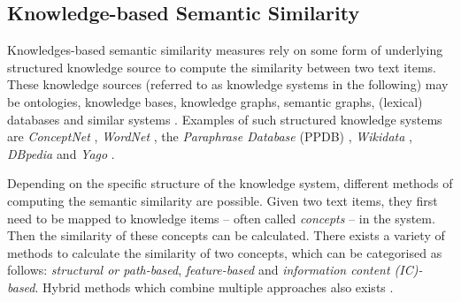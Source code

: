 \documentclass[11pt, numbers=noenddot]{scrreprt}
\let\cite\parencite  %
\begin{document}
\subsection{Knowledge-based Semantic Similarity}
\label{sec:knowledge-based-semantic-similarity}
Knowledges-based semantic similarity measures rely on some form of underlying structured knowledge source to compute the similarity between two text items. These knowledge sources (referred to as knowledge systems in the following) may be ontologies, knowledge bases, knowledge graphs, semantic graphs, (lexical) databases and similar systems \cite{chandrasekaranEvolutionSemanticSimilarity2021, harispeSemanticSimilarityNatural2015}. Examples of such structured knowledge systems are \textit{ConceptNet} \cite{speerConceptNetOpenMultilingual2017}, \textit{WordNet} \cite{millerWordNetLexicalDatabase1995}, the \textit{Paraphrase Database} (PPDB) \cite{ganitkevitchPPDBParaphraseDatabase2013}, \textit{Wikidata} \cite{vrandecicWikidataFreeCollaborative2014}, \textit{DBpedia} \cite{auerDBpediaNucleusWeb2007} and \textit{Yago} \cite{suchanekYagoCoreSemantic2007}.


Depending on the specific structure of the knowledge system, different methods of computing the semantic similarity are possible. Given two text items, they first need to be mapped to knowledge items -- often called \textit{concepts} -- in the system. Then the similarity of these concepts can be calculated. There exists a variety of methods to calculate the similarity of two concepts, which can be categorised as follows: \textit{structural or path-based}, \textit{feature-based} and \textit{information content (IC)-based}. Hybrid methods which combine multiple approaches also exists \cite{chandrasekaranEvolutionSemanticSimilarity2021, harispeSemanticSimilarityNatural2015}. 
\end{document}

